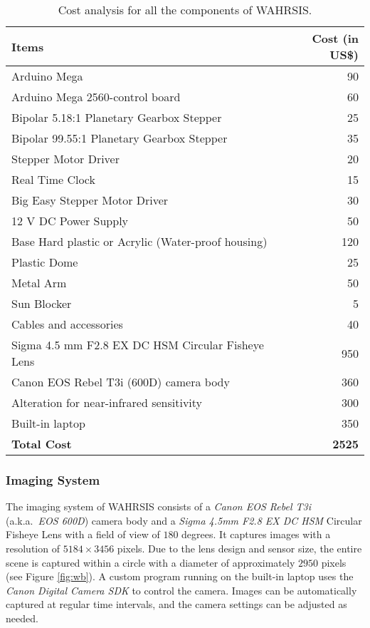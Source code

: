 \begin{table}[htbp]
\centering
\begin{scriptsize}
    \begin{tabular}{ | l | r |}
    \hline
    \textbf{Items} & \textbf{Cost (in US\$)} \\ \hline
    Arduino Mega & 90 \\ \hline
    Arduino Mega 2560-control board	& 60 \\ \hline
    Bipolar 5.18:1 Planetary Gearbox Stepper & 25 \\ \hline
    Bipolar 99.55:1 Planetary Gearbox Stepper & 35 \\ \hline
    Stepper Motor Driver & 20 \\ \hline
    Real Time Clock & 15 \\ \hline
    Big Easy Stepper Motor Driver & 30 \\ \hline
    12 V DC Power Supply & 50 \\ \hline
    Base Hard plastic or Acrylic (Water-proof housing) & 120 \\ \hline
    Plastic Dome & 25 \\ \hline
    Metal Arm & 50 \\ \hline
    Sun Blocker & 5 \\ \hline
    Cables and accessories & 40 \\ \hline
    Sigma 4.5 mm F2.8 EX DC HSM Circular Fisheye Lens & 950\\ \hline
    Canon EOS Rebel T3i (600D) camera body & 360 \\ \hline
    Alteration for near-infrared sensitivity & 300 \\ \hline
    Built-in laptop & 350 \\ \hline
    \textbf{Total Cost} & \textbf{2525} \\ \hline
    \end{tabular}
    \caption{Cost analysis for all the components of WAHRSIS.}
    \label{cost}
\end{scriptsize}
\end{table}

\subsubsection{Imaging System} 
\label{sec:camera}
The imaging system of WAHRSIS consists of a \emph{Canon EOS Rebel T3i} (a.k.a.~\emph{EOS 600D}) camera body and a \emph{Sigma 4.5mm F2.8 EX DC HSM} Circular Fisheye Lens with a field of view of $180$ degrees. It captures images with a resolution of $5184 \times 3456$ pixels. Due to the lens design and sensor size, the entire scene is captured within a circle with a diameter of approximately $2950$ pixels (see Figure \ref{fig:wb}). A custom program running on the built-in laptop uses the \emph{Canon Digital Camera SDK} to control the camera. Images can be automatically captured at regular time intervals, and the camera settings can be adjusted as needed.

